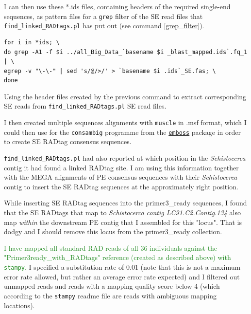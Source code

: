 \documentclass{article}\usepackage[]{graphicx}\usepackage[]{color}
\newcommand{\roger}[1]{ \textcolor[named]{ForestGreen}{#1} }
\begin{document}
I can then use these *.ids files, containing headers of the required single-end sequences, as pattern files for a \texttt{grep} filter of the SE read files that \texttt{find\_linked\_RADtags.pl} has put out (see command \ref{grep_filter}).

\begin{command}
\captionsetup{type=command}
\begin{Verbatim}
for i in *ids; \
do grep -A1 -f $i ../all_Big_Data_`basename $i _blast_mapped.ids`.fq_1 | \
egrep -v "\-\-" | sed 's/@/>/' > `basename $i .ids`_SE.fas; \
done
\end{Verbatim}
\caption{\small Using the header files created by the previous command to extract corresponding SE reads from \texttt{find\_linked\_RADtags.pl} SE read files.}
\label{grep_filter}
\end{command}

I then created multiple sequences alignments with \texttt{muscle} in .msf format, which I could then use for the \texttt{consambig} programme from the \href{http://emboss.sourceforge.net/apps/release/6.6/emboss/apps/consambig.html}{\texttt{emboss}} package in order to create SE RADtag consensus sequences.

\texttt{find\_linked\_RADtags.pl} had also reported at which position in the \textit{Schistocerca} contig it had found a linked RADtag site. I am using this information together with the MEGA alignments of PE consensus sequences with their \textit{Schistocerca} contig to insert the SE RADtag sequences at the approximately right position. 

While inserting SE RADtag sequences into the primer3\_ready sequences, I found that the SE RADtags that map to \textit{Schistocerca} {\color{red}\textit{contig LC91.C2.Contig.134}} also map \emph{within} the downstream PE contig that I assembled for this "locus". That is dodgy and I should remove this locus from the primer3\_ready collection.

\roger{I have mapped all standard RAD reads of all 36 individuals against the "Primer3ready\_with\_RADtags" reference (created as described above) with \texttt{stampy}.} I specified a substitution rate of 0.01 (note that this is not a maximum error rate allowed, but rather an average error rate expected) and I filtered out unmapped reads and reads with a mapping quality score below 4 (which according to the \texttt{stampy} readme file are reads with ambiguous mapping locations).
\end{document}

